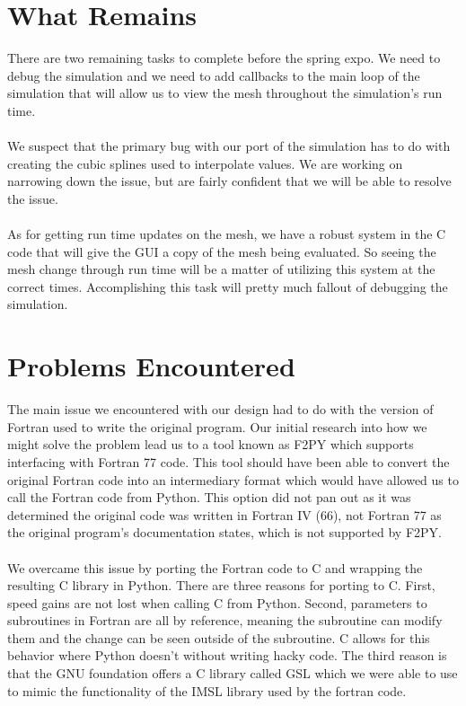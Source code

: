 \documentclass[onecolumn, draftclsnofoot,10pt, compsoc]{IEEEtran}
\begin{document}
\section{What Remains}
There are two remaining tasks to complete before the spring expo. We need to debug the simulation and we need to add callbacks to the main loop of the simulation that will allow us to view the mesh throughout the simulation's run time.\\\\
We suspect that the primary bug with our port of the simulation has to do with creating the cubic splines used to interpolate values. We are working on narrowing down the issue, but are fairly confident that we will be able to resolve the issue. \\\\
As for getting run time updates on the mesh, we have a robust system in the C code that will give the GUI a copy of the mesh being evaluated. So seeing the mesh change through run time will be a matter of utilizing this system at the correct times. Accomplishing this task will pretty much fallout of debugging the simulation. 

\section{Problems Encountered}
The main issue we encountered with our design had to do with the version of Fortran used to write the original program. Our initial research into how we might solve the problem lead us to a tool known as F2PY which supports interfacing with Fortran 77 code. This tool should have been able to convert the original Fortran code into an intermediary format which would have allowed us to call the Fortran code from Python. This option did not pan out as it was determined the original code was written in Fortran IV (66), not Fortran 77 as the original program's documentation states, which is not supported by F2PY.\\\\
We overcame this issue by porting the Fortran code to C and wrapping the resulting C library in Python. There are three reasons for porting to C. First, speed gains are not lost when calling C from Python. Second, parameters to subroutines in Fortran are all by reference, meaning the subroutine can modify them and the change can be seen outside of the subroutine. C allows for this behavior where Python doesn't without writing hacky code. The third reason is that the GNU foundation offers a C library called GSL which we were able to use to mimic the functionality of the IMSL library used by the fortran code. 
\end{document}
